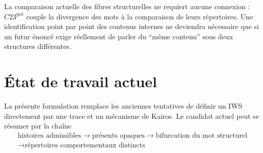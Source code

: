 \documentclass[11pt,a4paper]{article}
\theoremstyle{definition}
\theoremstyle{remark}
\begin{document}
La comparaison actuelle des fibres structurelles ne requiert aucune connexion : $C23^{\mathrm{pot}}$ couple la divergence des mots à la comparaison de leurs répertoires. Une identification point par point des contenus internes ne deviendra nécessaire que si un futur énoncé exige réellement de parler du ``même contenu'' sous deux structures différentes.

\section{État de travail actuel}

La présente formulation remplace les anciennes tentatives de définir un IWS directement par une trace et un mécanisme de Kairos. Le candidat actuel peut se résumer par la chaîne
\[
\boxed{
\begin{gathered}
\text{histoires admissibles}
\longrightarrow
\text{présents opaques}
\longrightarrow
\text{bifurcation du mot structurel}
\\[-0.2em]
\longrightarrow
\text{répertoires comportementaux distincts}
\end{gathered}}
\]
\end{document}
